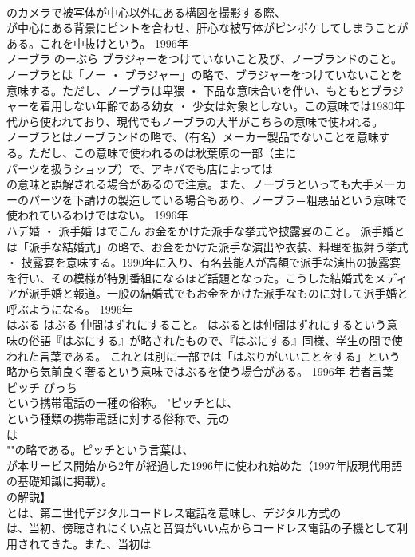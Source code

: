 \documentclass[8pt]{extreport}
\begin{document}
\begin{CJK}{UTF8}{min}
\\	のカメラで被写体が中心以外にある構図を撮影する際、
\\	が中心にある背景にピントを合わせ、肝心な被写体がピンボケしてしまうことがある。これを中抜けという。	1996年	
\\	ノーブラ	のーぶら	ブラジャーをつけていないこと及び、ノーブランドのこと。	
\\	ノーブラとは「ノー ・ ブラジャー」の略で、ブラジャーをつけていないことを意味する。ただし、ノーブラは卑猥 ・ 下品な意味合いを伴い、もともとブラジャーを着用しない年齢である幼女 ・ 少女は対象としない。この意味では1980年代から使われており、現代でもノーブラの大半がこちらの意味で使われる。 
\\	ノーブラとはノーブランドの略で、（有名）メーカー製品でないことを意味する。ただし、この意味で使われるのは秋葉原の一部（主に
\\	パーツを扱うショップ）で、アキバでも店によっては
\\	の意味と誤解される場合があるので注意。また、ノーブラといっても大手メーカーのパーツを下請けの製造している場合もあり、ノーブラ＝粗悪品という意味で使われているわけではない。	1996年	
\\	ハデ婚 ・ 派手婚	はでこん	お金をかけた派手な挙式や披露宴のこと。	派手婚とは「派手な結婚式」の略で、お金をかけた派手な演出や衣装、料理を振舞う挙式 ・ 披露宴を意味する。1990年に入り、有名芸能人が高額で派手な演出の披露宴を行い、その模様が特別番組になるほど話題となった。こうした結婚式をメディアが派手婚と報道。一般の結婚式でもお金をかけた派手なものに対して派手婚と呼ぶようになる。	1996年	
\\	はぶる	はぶる	仲間はずれにすること。	はぶるとは仲間はずれにするという意味の俗語『はぶにする』が略されたもので、『はぶにする』同様、学生の間で使われた言葉である。 これとは別に一部では「はぶりがいいことをする」という略から気前良く奢るという意味ではぶるを使う場合がある。	1996年	若者言葉	
\\	ピッチ	ぴっち	
\\	という携帯電話の一種の俗称。	"ピッチとは、
\\	という種類の携帯電話に対する俗称で、元の
\\	は
\\	""の略である。ピッチという言葉は、
\\	が本サービス開始から2年が経過した1996年に使われ始めた（1997年版現代用語の基礎知識に掲載）。 
\\	の解説】 
\\	とは、第二世代デジタルコードレス電話を意味し、デジタル方式の
\\	は、当初、傍聴されにくい点と音質がいい点からコードレス電話の子機として利用されてきた。また、当初は

\end{CJK}
\end{document}
